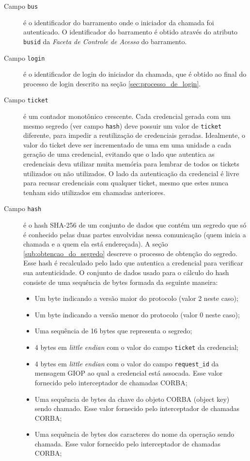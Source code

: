 \documentclass[]{article}
\newcommand{\term}[1]{\textit{#1}}
\newcommand{\code}[1]{\texttt{#1}}
\begin{document}
\begin{description}

	\item[Campo \code{bus}] é o identificador do barramento onde o iniciador da chamada foi autenticado.
O identificador do barramento é obtido através do atributo \code{busid} da \term{Faceta de Controle de Acesso} do barramento.

	\item[Campo \code{login}] é o identificador de login do iniciador da chamada, que é obtido ao final do processo de login descrito na seção \ref{sec:processo_de_login}.

	\item[Campo \code{ticket}] é um contador monotônico crescente.
	Cada credencial gerada com um mesmo segredo (ver campo \code{hash}) deve possuir um valor de \code{ticket} diferente, para impedir a reutilização de credenciais geradas.
	Idealmente, o valor do ticket deve ser incrementado de uma em uma unidade a cada geração de uma credencial, evitando que o lado que autentica as credenciais deva utilizar muita memória para lembrar de todos os tickets utilizados ou não utilizados.
	O lado da autenticação da credencial é livre para recusar credenciais com qualquer ticket, mesmo que estes nunca tenham sido utilizados em chamadas anteriores.

	\item[Campo \code{hash}] é o hash SHA-256 de um conjunto de dados que contém um segredo que só é conhecido pelas duas partes envolvidas nessa comunicação (quem inicia a chamada e a quem ela está endereçada).
	A seção \ref{sub:obtencao_do_segredo} descreve o processo de obtenção do segredo.
	Esse hash é recalculado pelo lado que autentica a credencial para verificar sua autenticidade.
	O conjunto de dados usado para o cálculo do hash consiste de uma sequência de bytes formada da seguinte maneira:

\begin{itemize}
	\item Um byte indicando a versão maior do protocolo (valor 2 neste caso);
	\item Um byte indicando a versão menor do protocolo (valor 0 neste caso);
	\item Uma sequência de 16 bytes que representa o segredo;
	\item 4 bytes em \term{little endian} com o valor do campo \code{ticket} da credencial;
	\item 4 bytes em \term{little endian} com o valor do campo \code{request\_id} da mensagem GIOP ao qual a credencial está assocada.
	Esse valor fornecido pelo interceptador de chamadas CORBA;
	\item Uma sequência de bytes da chave do objeto CORBA (object key) sendo chamado.
	Esse valor fornecido pelo interceptador de chamadas CORBA;
	\item Uma sequência de bytes dos caracteres do nome da operação sendo chamada.
	Esse valor fornecido pelo interceptador de chamadas CORBA;
\end{itemize}


\end{description}
\end{document}

